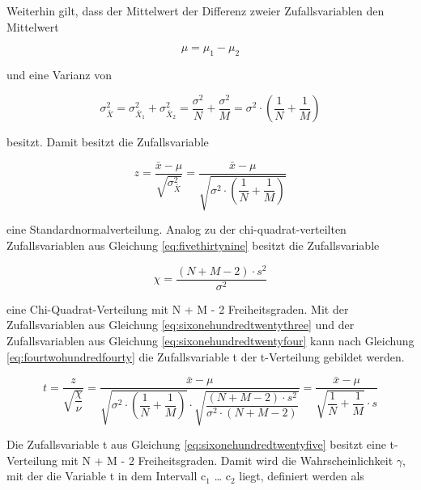 \noindent Weiterhin gilt, dass der Mittelwert der Differenz zweier Zufallsvariablen den Mittelwert

\begin{equation}\label{eq:sixonehundredtwentyone}
\mu =\mu _{1} -\mu _{2}
\end{equation}

\noindent und eine Varianz von

\begin{equation}\label{eq:sixonehundredtwentytwo}
\sigma _{\bar{X}}^{2} =\sigma _{\bar{X}_{1} }^{2} +\sigma _{\bar{X}_{2} }^{2} =\dfrac{\sigma ^{2} }{N} +\dfrac{\sigma ^{2} }{M} =\sigma ^{2} \cdot \left(\dfrac{1}{N} +\dfrac{1}{M} \right)
\end{equation}

\noindent besitzt. Damit besitzt die Zufallsvariable

\begin{equation}\label{eq:sixonehundredtwentythree}
z=\dfrac{\bar{x}-\mu }{\sqrt{\sigma _{\bar{X}}^{2} } } =\dfrac{\bar{x}-\mu }{\sqrt{\sigma ^{2} \cdot \left(\dfrac{1}{N} +\dfrac{1}{M} \right)} }
\end{equation}

\noindent eine Standardnormalverteilung. Analog zu der chi-quadrat-verteilten Zufallsvariablen aus Gleichung \eqref{eq:fivethirtynine} besitzt die Zufallsvariable 

\begin{equation}\label{eq:sixonehundredtwentyfour}
\chi =\dfrac{\left(N+M-2\right)\cdot s^{2} }{\sigma ^{2} }
\end{equation}

\noindent eine Chi-Quadrat-Verteilung mit N + M - 2 Freiheitsgraden. Mit der Zufallsvariablen aus Gleichung \eqref{eq:sixonehundredtwentythree} und der Zufallsvariablen aus Gleichung \eqref{eq:sixonehundredtwentyfour} kann nach Gleichung \eqref{eq:fourtwohundredfourty} die Zufallsvariable t der t-Verteilung gebildet werden.

\begin{equation}\label{eq:sixonehundredtwentyfive}
t=\dfrac{z}{\sqrt{\dfrac{\chi }{\nu } } } =\dfrac{\bar{x}-\mu }{\sqrt{\sigma ^{2} \cdot \left(\dfrac{1}{N} +\dfrac{1}{M} \right)} \cdot \sqrt{\dfrac{\left(N+M-2\right)\cdot s^{2} }{\sigma ^{2} \cdot \left(N+M-2\right)} } } =\dfrac{\bar{x}-\mu }{\sqrt{\dfrac{1}{N} +\dfrac{1}{M} } \cdot s}
\end{equation}

\noindent Die Zufallsvariable t aus Gleichung \eqref{eq:sixonehundredtwentyfive} besitzt eine t-Verteilung mit N + M - 2 Freiheitsgraden. Damit wird die Wahrscheinlichkeit $\gamma$, mit der die Variable t in dem Intervall c$_{1}$ {\dots} c$_{2}$ liegt, definiert werden als

